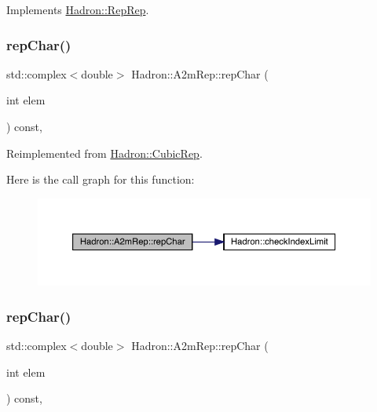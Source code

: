 Implements \mbox{\hyperlink{structHadron_1_1RepRep_ab3213025f6de249f7095892109575fde}{Hadron\+::\+Rep\+Rep}}.

\mbox{\label{structHadron_1_1A2mRep_a67d04149198c33ca703b1eb5fc0198f8}} 
\subsubsection{\texorpdfstring{repChar()}{repChar()}\hspace{0.1cm}{\footnotesize\ttfamily [1/3]}}
{\footnotesize\ttfamily std\+::complex$<$double$>$ Hadron\+::\+A2m\+Rep\+::rep\+Char (\begin{DoxyParamCaption}\item[{int}]{elem }\end{DoxyParamCaption}) const\hspace{0.3cm}{\ttfamily [inline]}, {\ttfamily [virtual]}}



Reimplemented from \mbox{\hyperlink{structHadron_1_1CubicRep_af45227106e8e715e84b0af69cd3b36f8}{Hadron\+::\+Cubic\+Rep}}.

Here is the call graph for this function\+:
\nopagebreak
\begin{figure}[H]
\begin{center}
\leavevmode
\includegraphics[width=350pt]{da/db3/structHadron_1_1A2mRep_a67d04149198c33ca703b1eb5fc0198f8_cgraph}
\end{center}
\end{figure}
\mbox{\label{structHadron_1_1A2mRep_a67d04149198c33ca703b1eb5fc0198f8}} 
\subsubsection{\texorpdfstring{repChar()}{repChar()}\hspace{0.1cm}{\footnotesize\ttfamily [2/3]}}
{\footnotesize\ttfamily std\+::complex$<$double$>$ Hadron\+::\+A2m\+Rep\+::rep\+Char (\begin{DoxyParamCaption}\item[{int}]{elem }\end{DoxyParamCaption}) const\hspace{0.3cm}{\ttfamily [inline]}, {\ttfamily [virtual]}}



